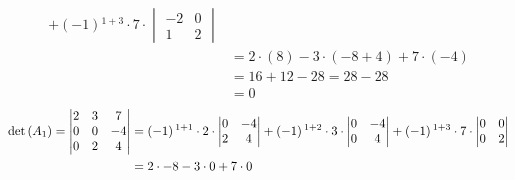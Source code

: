 \begin{enumerate}[label=\listAlph]
\[\begin{aligned}
                    +
                    \left(-1\right){}^{1 + 3} \cdot
                    7 \cdot
                    \begin{vmatrix}
                        -2 & 0 \\
                        1 & 2
                    \end{vmatrix}
                    \\
                    &=
                    2 \cdot \left(8\right)
                    -3 \cdot \left(-8 + 4\right)
                    +7 \cdot \left(-4\right)
                    \\
                    &= 16 + 12 - 28
                    = 28 - 28
                    \\
                    &= 0
                \end{aligned}
            \]
            \[
                \begin{aligned}
                    \pdet{A_1} =
                    \begin{vmatrix}
                        2 & 3 & 7 \\
                        0 & 0 & -4 \\
                        0 & 2 & 4
                    \end{vmatrix}
                    &=
                    \left(-1\right){}^{1 + 1} \cdot 
                    2 \cdot 
                    \begin{vmatrix}
                        0 & -4 \\
                        2 & 4
                    \end{vmatrix}
                    + \left(-1\right){}^{1 + 2} \cdot 
                    3 \cdot 
                    \begin{vmatrix}
                        0 & -4 \\
                        0 & 4
                    \end{vmatrix}
                    +\left(-1\right){}^{1 + 3} \cdot 
                    7 \cdot 
                    \begin{vmatrix}
                        0 & 0 \\
                        0 & 2
                    \end{vmatrix}
                    \\
                    &=
                    2 \cdot -8 
                    -3 \cdot 0
                    +7 \cdot 0
                    \\

\end{aligned}\]
\end{enumerate}
